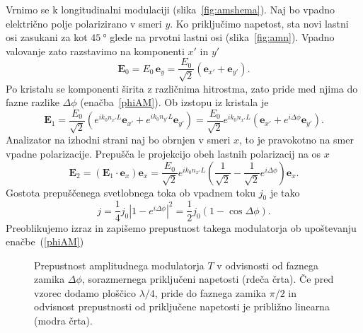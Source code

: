 Vrnimo se k longitudinalni
modulaciji (slika~\ref{fig:amshema}).
Naj bo vpadno električno polje polarizirano v smeri $y$. 
Ko priključimo napetost, sta novi lastni osi zasukani 
za kot $45~\si{\degree}$ glede na prvotni lastni osi (slika~\ref{fig:amn}). Vpadno 
valovanje zato razstavimo na komponenti $x'$ in $y'$
\begin{equation}
\mathbf{E}_0 = E_0\, \mathbf{e}_y = \frac{E_0}{\sqrt{2}}\left(\mathbf{e}_{x'} + \mathbf{e}_{y'}\right).
\end{equation}
Po kristalu se komponenti širita z različnima hitrostma, zato pride med njima do 
fazne razlike $\Delta \phi$ 
(enačba~\ref{phiAM}). Ob izstopu iz kristala je 
\begin{equation}
\mathbf{E}_1 = \frac{E_0}{\sqrt{2}}\left(e^{ik_0 n_{x'}L}\mathbf{e}_{x'} + 
e^{ik_0 n_{y'}L}\mathbf{e}_{y'}\right)
= \frac{E_0}{\sqrt{2}}e^{ik_0 n_{x'}L}\left(\mathbf{e}_{x'} + 
e^{i\Delta\phi}\mathbf{e}_{y'}\right).
\end{equation}
Analizator na izhodni strani naj bo obrnjen v smeri $x$, to je pravokotno
na smer vpadne polarizacije. Prepušča le projekcijo obeh lastnih polarizacij
na os $x$
\begin{equation}
\mathbf{E}_2= \left(\mathbf{E}_1 \cdot \mathbf{e}_x\right)\mathbf{e}_x = 
\frac{E_0}{\sqrt{2}}e^{ik_0 n_{x'}L}
\left(\frac{1}{\sqrt{2}} -\frac{1}{\sqrt{2}} e^{i\Delta\phi}\right)\mathbf{e}_x .
\label{7.16}
\end{equation}
Gostota prepuščenega svetlobnega toka ob vpadnem toku $j_0$ je tako 
\begin{equation}
j=\frac{1}{4}j_{0}\left|1-e^{i\Delta\phi}\right|^{2}=\frac{1}{2}j_{0}(1-\cos\Delta\phi).
\label{7.17}
\end{equation}
Preoblikujemo izraz in zapišemo prepustnost takega modulatorja ob upoštevanju 
enačbe~(\ref{phiAM})
\begin{figure}[h]
\centering
\def\svgwidth{70truemm} 

\caption{Prepustnost amplitudnega modulatorja $T$ v odvisnosti od faznega zamika $\Delta \phi$, 
sorazmernega priključeni napetosti (rdeča črta). Če pred vzorec dodamo ploščico $\lambda/4$, 
pride do faznega zamika $\pi/2$ in odvisnost prepustnosti od priključene napetosti
je približno linearna (modra črta).}
\label{fig:amt}
\end{figure}

